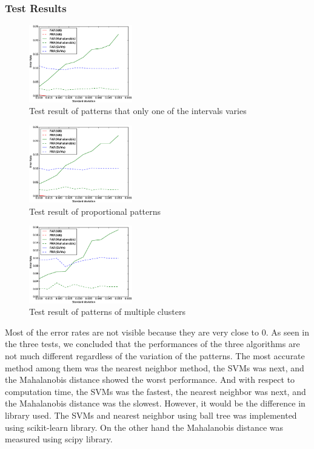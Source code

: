 \documentclass[twocolumn,showpacs,%
  nofootinbib,aps,%
  eqsecnum,prd,notitlepage,showkeys,10pt]{revtex4-1}
\begin{document}
\subsubsection{Test Results}
\begin{figure}[ht]
  \centering
  \includegraphics[width=0.4\textwidth]{one}
  \caption{Test result of patterns that only one of the intervals varies}
  \label{fig:one}
\end{figure}
\begin{figure}[ht]
  \centering
  \includegraphics[width=0.4\textwidth]{prop}
  \caption{Test result of proportional patterns}
  \label{fig:prop}
\end{figure}
\begin{figure}[ht]
  \centering
  \includegraphics[width=0.4\textwidth]{multi}
  \caption{Test result of patterns of multiple clusters}
  \label{fig:multi}
\end{figure}

Most of the error rates are not visible because they are very close to 0. As seen in the three tests, we concluded that the performances of the three algorithms are not much different regardless of the variation of the patterns. The most accurate method among them was the nearest neighbor method, the SVMs was next, and the Mahalanobis distance showed the worst performance. And with respect to computation time, the SVMs was the fastest, the nearest neighbor was next, and the Mahalanobis distance was the slowest. However, it would be the difference in library used. The SVMs and nearest neighbor using ball tree was implemented using scikit-learn library. On the other hand the Mahalanobis distance was measured using scipy library.
\end{document}

